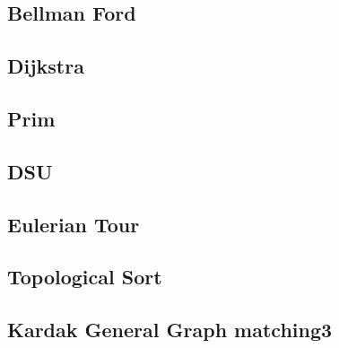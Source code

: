 \documentclass[a4paper,landscape]{article}
\begin{document}
\begin{multicols}{2}
\subsection{Bellman Ford}
	
\subsection{Dijkstra}
	
\subsection{Prim}
	
\subsection{DSU}
	
\subsection{Eulerian Tour}
	
\subsection{Topological Sort}
	
\subsection{Kardak General Graph matching3}
	

\end{multicols}
\end{document}

